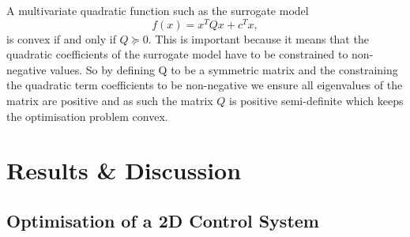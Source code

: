 \documentclass[conference]{IEEEtran}
\theoremstyle{definition}
\begin{document}
A multivariate quadratic function such as the surrogate model
\begin{equation}
    f(x) = x^TQx + c^Tx,
\end{equation}
is convex if and only if $Q \succcurlyeq 0$. This is important because it means that the quadratic coefficients of the surrogate model have to be constrained to non-negative values. So by defining Q to be a symmetric matrix and the constraining the quadratic term coefficients to be non-negative we ensure all eigenvalues of the matrix are positive and as such the matrix $Q$ is positive semi-definite which keeps the optimisation problem convex.  


\section{Results \& Discussion}
\subsection{Optimisation of a 2D Control System}
\end{document}
